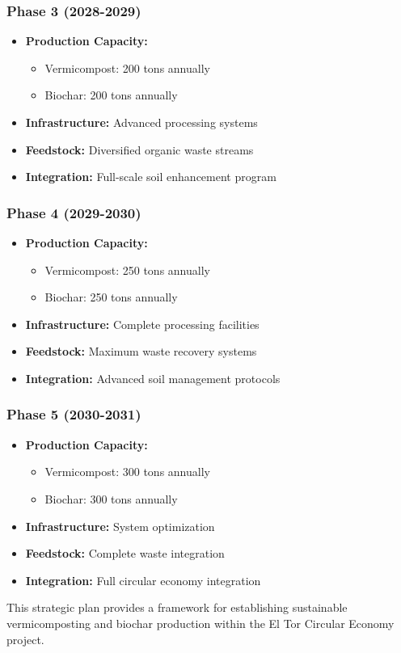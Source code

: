 \subsubsection{Phase 3 (2028-2029)}
\begin{itemize}
    \item \textbf{Production Capacity:}
    \begin{itemize}
        \item Vermicompost: 200 tons annually
        \item Biochar: 200 tons annually
    \end{itemize}
    \item \textbf{Infrastructure:} Advanced processing systems
    \item \textbf{Feedstock:} Diversified organic waste streams
    \item \textbf{Integration:} Full-scale soil enhancement program
\end{itemize}

\subsubsection{Phase 4 (2029-2030)}
\begin{itemize}
    \item \textbf{Production Capacity:}
    \begin{itemize}
        \item Vermicompost: 250 tons annually
        \item Biochar: 250 tons annually
    \end{itemize}
    \item \textbf{Infrastructure:} Complete processing facilities
    \item \textbf{Feedstock:} Maximum waste recovery systems
    \item \textbf{Integration:} Advanced soil management protocols
\end{itemize}

\subsubsection{Phase 5 (2030-2031)}
\begin{itemize}
    \item \textbf{Production Capacity:}
    \begin{itemize}
        \item Vermicompost: 300 tons annually
        \item Biochar: 300 tons annually
    \end{itemize}
    \item \textbf{Infrastructure:} System optimization
    \item \textbf{Feedstock:} Complete waste integration
    \item \textbf{Integration:} Full circular economy integration
\end{itemize}

This strategic plan provides a framework for establishing sustainable vermicomposting and biochar production within the El Tor Circular Economy project.
